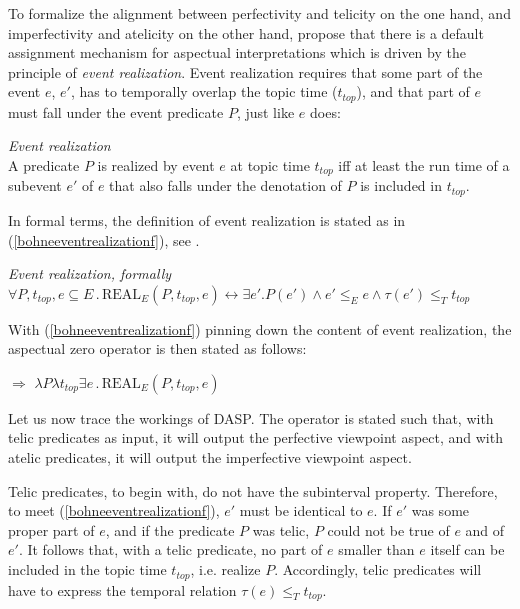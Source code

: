 \documentclass[output=paper,colorlinks,citecolor=brown]{langscibook}
\begin{document}

To formalize the alignment between perfectivity and telicity on the one hand, and imperfectivity and atelicity 
on the other hand, \citet{Bohne2004} propose 
that there is a default assignment mechanism for aspectual interpretations which is 
driven by the principle of \textit{event realization}.
Event realization 
requires that some part of the event $e$, $e'$,
has to temporally overlap the topic time ($t_{top}$), and that part of $e$ must fall under the event predicate $P$, just like $e$ does:

\eanoraggedright\label{bohneeventrealization} 
\textit{Event realization} \citep[286]{Bohne2004}\\
A predicate $P$ is realized by event $e$ at topic time $t_{top}$ iff at least the run time of a subevent $e'$ of $e$ that also falls under the denotation 
of $P$ is included in $t_{top}$.
\z

\noindent In formal terms, the definition of event realization is stated as in (\ref{bohneeventrealizationf}),
see \citet[286]{Bohne2004}.

\ea\label{bohneeventrealizationf} 
\textit{Event realization, formally}\\
$\forall P, t_{top}, e \subseteq E\,.\, \text{REAL}_E(P,t_{top},e) \leftrightarrow \exists e' . P(e') \wedge e' \leq_E e \wedge \tau(e') \leq_T t_{top} $
\z

\noindent With (\ref{bohneeventrealizationf}) pinning down the content of event realization, the aspectual zero operator is then stated as follows:

\ea
\label{bohnedasp} 
 $\Rightarrow$ $\lambda P \lambda t_{top} \exists e\,.\,\text{REAL}_E(P, t_{top}, e)$
\z

\noindent Let us now trace the workings of DASP. The operator is stated such that, with telic predicates as input, it will output the perfective viewpoint aspect, and with atelic predicates, it will output the imperfective viewpoint aspect. 

Telic predicates, to begin with, do not have the subinterval property. Therefore, to meet (\ref{bohneeventrealizationf}), $e'$ must be
identical to $e$. If $e'$ was some proper part of $e$, and if the predicate $P$ was telic, $P$ could not be true of $e$ and of $e'$. It follows that, with a telic predicate, no part of $e$ smaller
than $e$ itself can be included in the topic time $t_{top}$, i.e. realize $P$. Accordingly, telic predicates will have to express the
temporal relation $\tau(e) \leq_T t_{top}$. 
\end{document}
